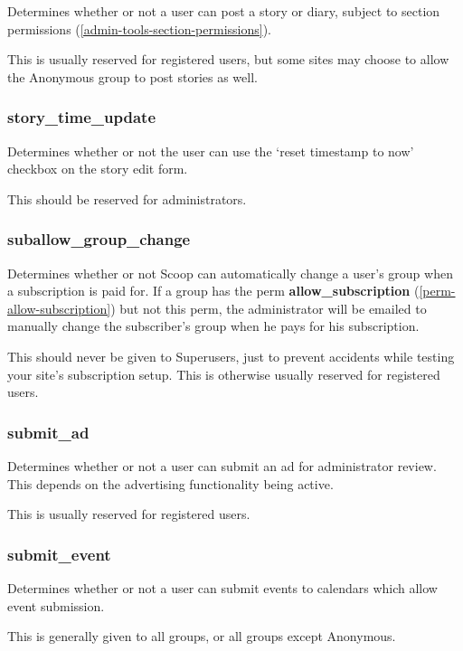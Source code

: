 Determines whether or not a user can post a story or diary, subject to section permissions (\ref{admin-tools-section-permissions}).

This is usually reserved for registered users, but some sites may choose to allow the Anonymous group to post stories as well.

\subsubsection{story\_time\_update}
\label{perm-story-time-update}

Determines whether or not the user can use the `reset timestamp to now' checkbox on the story edit form.

This should be reserved for administrators.

\subsubsection{suballow\_group\_change}
\label{perm-suballow-group-change}

Determines whether or not Scoop can automatically change a user's group when a subscription is paid for. If a group has the perm {\bf allow\_subscription} (\ref{perm-allow-subscription}) but not this perm, the administrator will be emailed to manually change the subscriber's group when he pays for his subscription.

This should never be given to Superusers, just to prevent accidents while testing your site's subscription setup. This is otherwise usually reserved for registered users.

\subsubsection{submit\_ad}
\label{perm-submit-ad}

Determines whether or not a user can submit an ad for administrator review.  This depends on the advertising functionality being active.

This is usually reserved for registered users.

\subsubsection{submit\_event}
\label{perm-submit-event}

Determines whether or not a user can submit events to calendars which allow event submission.

This is generally given to all groups, or all groups except Anonymous.

